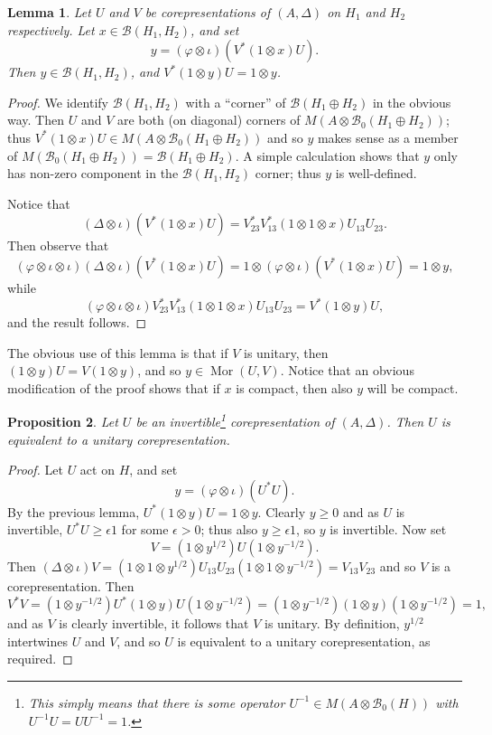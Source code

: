 \documentclass[twoside,a4paper,12pt]{article}
\theoremstyle{plain}
\newtheorem{proposition}{Proposition}[section]
\newtheorem{lemma}[proposition]{Lemma}
\theoremstyle{definition}
\newcommand{\mc}{\mathcal}
\newcommand{\mor}{\operatorname{Mor}}
\begin{document}
\begin{lemma}\label{lem:one}
Let $U$ and $V$ be corepresentations of $(A,\Delta)$ on $H_1$ and $H_2$
respectively.  Let $x\in\mc B(H_1,H_2)$, and set
\[ y = (\varphi\otimes\iota)(V^*(1\otimes x)U). \]
Then $y\in\mc B(H_1,H_2)$, and $V^*(1\otimes y)U = 1\otimes y$.
\end{lemma}
\begin{proof}
We identify $\mc B(H_1,H_2)$ with a ``corner'' of $\mc B(H_1\oplus H_2)$
in the obvious way.  Then $U$ and $V$ are both (on diagonal) corners of $M(A\otimes\mc B_0(H_1\oplus H_2))$; thus $V^*(1\otimes x)U
\in M(A\otimes\mc B_0(H_1\oplus H_2))$ and so $y$ makes sense as a member
of $M(\mc B_0(H_1\oplus H_2)) = \mc B(H_1\oplus H_2)$.  A simple calculation
shows that $y$ only has non-zero component in the $\mc B(H_1,H_2)$ corner;
thus $y$ is well-defined.

Notice that
\[ (\Delta\otimes\iota)(V^*(1\otimes x)U) = V_{23}^* V_{13}^*
(1\otimes 1\otimes x) U_{13} U_{23}. \]
Then observe that
\[ (\varphi\otimes\iota\otimes\iota)(\Delta\otimes\iota)(V^*(1\otimes x)U)
= 1\otimes(\varphi\otimes\iota)(V^*(1\otimes x)U) = 1\otimes y, \]
while
\[ (\varphi\otimes\iota\otimes\iota)V_{23}^* V_{13}^*
(1\otimes 1\otimes x) U_{13} U_{23}
= V^* (1\otimes y) U, \]
and the result follows.
\end{proof}

The obvious use of this lemma is that if $V$ is unitary, then
$(1\otimes y)U = V(1\otimes y)$, and so $y\in\mor(U,V)$.  Notice that an
obvious modification of the proof shows that if $x$ is compact, then
also $y$ will be compact.

\begin{proposition}\label{prop:invsimuni}
Let $U$ be an invertible\footnote{This simply means that there is
some operator $U^{-1}\in M(A\otimes\mc B_0(H))$ with $U^{-1}U=UU^{-1}=1$.}
corepresentation of $(A,\Delta)$.  Then $U$ is equivalent to a unitary
corepresentation.
\end{proposition}
\begin{proof}
Let $U$ act on $H$, and set
\[ y = (\varphi\otimes\iota)(U^*U). \]
By the previous lemma, $U^*(1\otimes y)U = 1\otimes y$.  Clearly $y\geq0$
and as $U$ is invertible, $U^*U\geq\epsilon 1$ for some $\epsilon>0$;
thus also $y\geq \epsilon 1$, so $y$ is invertible.  Now set
\[ V = (1\otimes y^{1/2})U (1\otimes y^{-1/2}). \]
Then $(\Delta\otimes\iota)V = (1\otimes 1\otimes y^{1/2})
U_{13} U_{23} (1\otimes 1\otimes y^{-1/2}) = V_{13} V_{23}$ and so
$V$ is a corepresentation.  Then
\[ V^*V = (1\otimes y^{-1/2})U^*(1\otimes y) U (1\otimes y^{-1/2})
= (1\otimes y^{-1/2}) (1\otimes y)  (1\otimes y^{-1/2}) = 1, \]
and as $V$ is clearly invertible, it follows that $V$ is unitary.
By definition, $y^{1/2}$ intertwines $U$ and $V$, and so $U$ is equivalent
to a unitary corepresentation, as required.
\end{proof}
\end{document}
